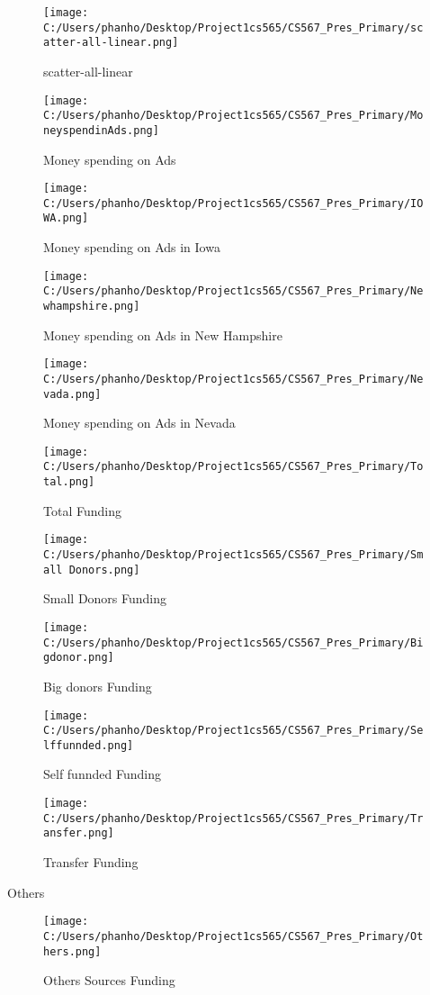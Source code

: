 \begin{figure}[H]
    \centering
    \texttt{[image: C:/Users/phanho/Desktop/Project1cs565/CS567\_Pres\_Primary/scatter-all-linear.png]}
    \caption{scatter-all-linear}
    \label{scatter-all-linear}
\end{figure}
\begin{figure}[H]
    \centering
    \texttt{[image: C:/Users/phanho/Desktop/Project1cs565/CS567\_Pres\_Primary/MoneyspendinAds.png]}
    \caption{Money spending on Ads}
    \label{MoneyspendinAds}
\end{figure}
\begin{figure}[H]
    \centering
    \texttt{[image: C:/Users/phanho/Desktop/Project1cs565/CS567\_Pres\_Primary/IOWA.png]}
    \caption{Money spending on Ads in Iowa}
    \label{IOWA}
\end{figure}

\begin{figure}[H]
    \centering
    \texttt{[image: C:/Users/phanho/Desktop/Project1cs565/CS567\_Pres\_Primary/Newhampshire.png]}
    \caption{Money spending on Ads in New Hampshire}
    \label{Newhampshire}
\end{figure}
\begin{figure}[H]
    \centering
    \texttt{[image: C:/Users/phanho/Desktop/Project1cs565/CS567\_Pres\_Primary/Nevada.png]}
    \caption{Money spending on Ads in Nevada}
    \label{Nevada}
\end{figure}
\begin{figure}[H]
    \centering
    \texttt{[image: C:/Users/phanho/Desktop/Project1cs565/CS567\_Pres\_Primary/Total.png]}
    \caption{Total Funding}
    \label{Total}
\end{figure}
\begin{figure}[H]
    \centering
    \texttt{[image: C:/Users/phanho/Desktop/Project1cs565/CS567\_Pres\_Primary/Small Donors.png]}
    \caption{Small Donors Funding}
    \label{Small Donors}
\end{figure}
\begin{figure}[H]
    \centering
    \texttt{[image: C:/Users/phanho/Desktop/Project1cs565/CS567\_Pres\_Primary/Bigdonor.png]}
    \caption{Big donors Funding}
    \label{Bigdonor}
\end{figure}
\begin{figure}[H]
    \centering
    \texttt{[image: C:/Users/phanho/Desktop/Project1cs565/CS567\_Pres\_Primary/Selffunnded.png]}
    \caption{Self funnded Funding}
    \label{Selffunnded}
\end{figure}
\begin{figure}[H]
    \centering
    \texttt{[image: C:/Users/phanho/Desktop/Project1cs565/CS567\_Pres\_Primary/Transfer.png]}
    \caption{Transfer Funding}
    \label{Transfer}
\end{figure}
Others
\begin{figure}[H]
    \centering
    \texttt{[image: C:/Users/phanho/Desktop/Project1cs565/CS567\_Pres\_Primary/Others.png]}
    \caption{Others Sources Funding}
    \label{Others}
\end{figure}